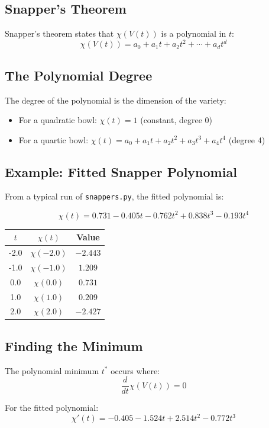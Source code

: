 \documentclass[11pt]{amsart}
\begin{document}
\subsection{Snapper's Theorem}

Snapper's theorem states that $\chi(V(t))$ is a polynomial in $t$:
\[
\chi(V(t)) = a_0 + a_1 t + a_2 t^2 + \cdots + a_d t^d
\]

\subsection{The Polynomial Degree}

The degree of the polynomial is the dimension of the variety:
\begin{itemize}
    \item For a quadratic bowl: $\chi(t) = 1$ (constant, degree 0)
    \item For a quartic bowl: $\chi(t) = a_0 + a_1 t + a_2 t^2 + a_3 t^3 + a_4 t^4$ (degree 4)
\end{itemize}

\subsection{Example: Fitted Snapper Polynomial}

From a typical run of \texttt{snappers.py}, the fitted polynomial is:

\[
\chi(t) = 0.731 - 0.405t - 0.762t^2 + 0.838t^3 - 0.193t^4
\]

\begin{center}
\begin{tabular}{c|c|c}
$t$ & $\chi(t)$ & Value \\
\hline
-2.0 & $\chi(-2.0)$ & $-2.443$ \\
-1.0 & $\chi(-1.0)$ & $1.209$ \\
 0.0 & $\chi(0.0)$  & $0.731$ \\
 1.0 & $\chi(1.0)$  & $0.209$ \\
 2.0 & $\chi(2.0)$  & $-2.427$
\end{tabular}
\end{center}

\subsection{Finding the Minimum}

The polynomial minimum $t^*$ occurs where:
\[
\frac{d}{dt}\chi(V(t)) = 0
\]

For the fitted polynomial:
\[
\chi'(t) = -0.405 - 1.524t + 2.514t^2 - 0.772t^3
\]
\end{document}
